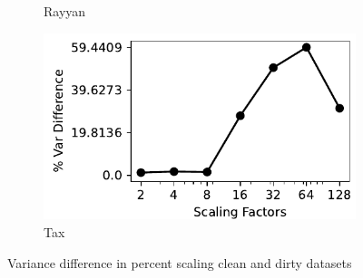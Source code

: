 \begin{figure}[!t]
\begin{subfigure}{0.32\textwidth}
    \caption{Rayyan}
    \label{exp:var_rayyan}
\end{subfigure}
\hfill
\begin{subfigure}{0.32\textwidth}
    \includegraphics[width=\textwidth]{figures/plot/var/variance_diff_tax.pdf}
    \caption{Tax}
    \label{exp:var_tax}
\end{subfigure}
\hfill
\caption{Variance difference in percent scaling clean and dirty datasets}
\label{exp:var_difference_datasets}
\end{figure}

